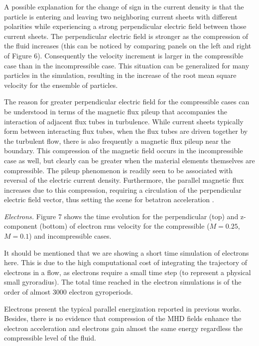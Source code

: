 \documentclass[%
aip,pop,amsmath,amssymb,
 reprint,%
]{revtex4-1}
\begin{document}
{{A possible explanation for the change of sign in the current density is 
that the particle is entering and leaving two neighboring 
current sheets with different polarities while experiencing
a strong perpendicular electric field between those current sheets. 
The perpendicular electric field
is stronger as the compression of the fluid increases (this can be noticed
by comparing panels on the left and right of Figure 6).
Consequently the velocity increment is larger in the compressible case 
than in the incompressible case.
This situation can be 
generalized for many particles in the simulation, 
resulting in the increase of the root mean 
square velocity for the ensemble of particles. 

The reason for greater perpendicular electric field for the compressible cases 
can be understood in terms of the magnetic flux pileup that accompanies the 
interaction of adjacent flux tubes in turbulence\cite{ServidioEA10}. 
While current sheets typically form between interacting flux tubes, 
when the flux tubes are driven together by the turbulent flow, there
is also frequently a magnetic flux pileup near the boundary.
This compression of the magnetic field occurs in the incompressible case as well, 
but clearly can be greater when the material elements themselves are compressible.   
The pileup phenomenon is readily seen to be associated with 
reversal of the electric current density. Furthermore, the parallel magnetic flux increases
due to this compression, requiring a circulation of the perpendicular electric field vector, 
thus setting the scene for betatron acceleration \cite{Dalena2012}.

{\it Electrons.}
Figure 7 shows the time evolution for the perpendicular (top) 
and z-component (bottom) of electron
rms velocity for the compressible ($M=0.25$, $M=0.1$) and incompressible cases.

It should be mentioned that we are showing
a short time simulation of electrons here.
This is due to the high computational cost of integrating the trajectory of electrons
in a flow, as electrons require a small time step (to represent a physical 
small gyroradius).  The total time reached in the electron simulations
is of the order of almost 3000 
electron gyroperiods. 

Electrons present the typical parallel energization reported in previous works. 
Besides, there is no evidence that compression of the MHD fields enhance the electron 
acceleration and electrons gain almost the same energy regardless the compressible level of
the fluid.


}}
\end{document}
